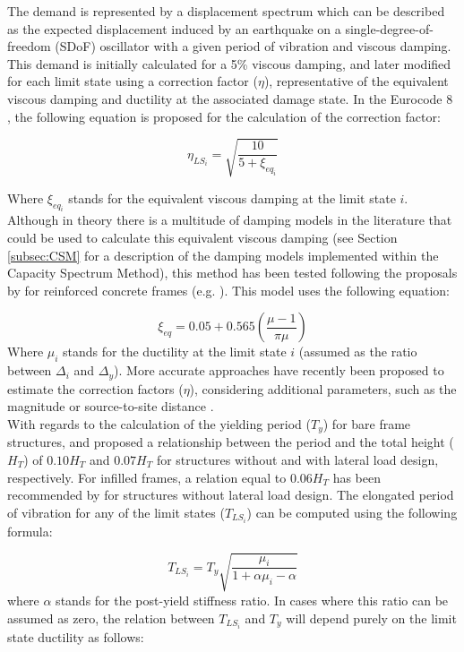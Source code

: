 The demand is represented by a displacement spectrum which can be described as the expected displacement induced by an earthquake on a single-degree-of-freedom (SDoF) oscillator with a given period of vibration and viscous damping. This demand is initially calculated for a 5\% viscous damping, and later modified for each limit state using a correction factor ($\eta$), representative of the equivalent viscous damping and ductility at the associated damage state. In the Eurocode 8 \citep{CEN2005}, the following equation is proposed for the calculation of the correction factor:

\begin{equation}
\eta_{LS_i} = \sqrt{\frac{10}{5+\xi_{eq_i}}}
\end{equation}

Where $\xi_{eq_i}$ stands for the equivalent viscous damping at the limit state $i$. Although in theory there is a multitude of damping models in the literature that could be used to calculate this equivalent viscous damping (see Section \ref{subsec:CSM} for a description of the damping models implemented within the Capacity Spectrum Method), this method has been tested following the proposals by \cite{PriestleyEtAl2007} for reinforced concrete frames (e.g. \cite{BalEtAl2010} \cite{SilvaEtAl2013}). This model uses the following equation:

\begin{equation}
\xi_{eq} = 0.05 + 0.565\left(\frac{\mu-1}{\pi\mu}\right)
\end{equation}
Where $\mu_i$ stands for the ductility at the limit state $i$ (assumed as the ratio between $\Delta_i$ and $\Delta_y$). More accurate approaches have recently been proposed to estimate the correction factors ($\eta$), considering additional parameters, such as the magnitude or source-to-site distance \citep{RezaeianEtAl2012}.\\

With regards to the calculation of the yielding period ($T_y$) for bare frame structures, \cite{CrowleyPinho2004} and \cite{CrowleyEtAl2008} proposed a relationship between the period and the total height ($H_T$) of $0.10H_T$ and $0.07H_T$ for structures without and with lateral load design, respectively. For infilled frames, a relation equal to $0.06H_T$ has been recommended by \cite{CrowleyPinho2006} for structures without lateral load design. The elongated period of vibration for any of the limit states ($T_{LS_i}$) can be computed using the following formula:

\begin{equation}
T_{LS_i} = T_y\sqrt{\frac{\mu_{i}}{1+\alpha\mu_{i}-\alpha}}
\end{equation}
where $\alpha$ stands for the post-yield stiffness ratio. In cases where this ratio can be assumed as zero, the relation between $T_{LS_i}$ and $T_y$ will depend purely on the limit state ductility as follows:

